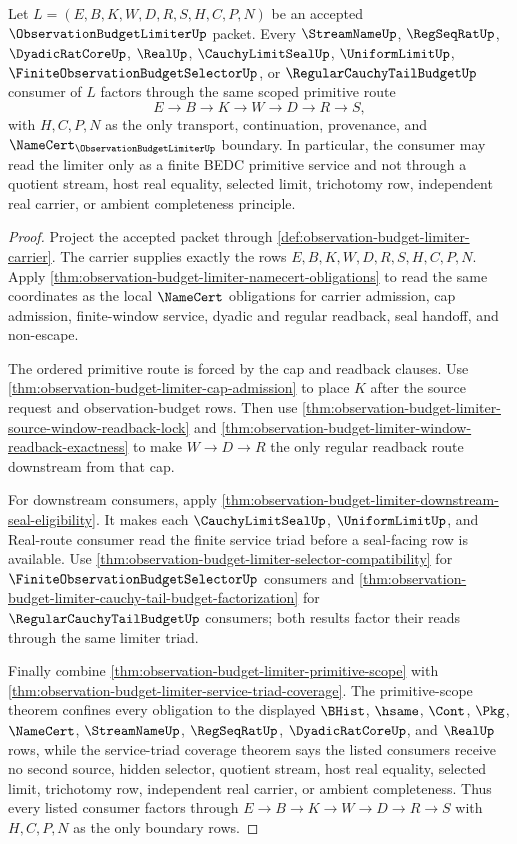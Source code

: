 \begin{theorem}
\label{thm:observation-budget-limiter-scoped-route-factorization}
Let $L=(E,B,K,W,D,R,S,H,C,P,N)$ be an accepted $\ObservationBudgetLimiterUp$ packet. Every $\StreamNameUp$, $\RegSeqRatUp$, $\DyadicRatCoreUp$, $\RealUp$, $\CauchyLimitSealUp$, $\UniformLimitUp$, $\FiniteObservationBudgetSelectorUp$, or $\RegularCauchyTailBudgetUp$ consumer of $L$ factors through the same scoped primitive route
$$
E \to B \to K \to W \to D \to R \to S,
$$
with $H,C,P,N$ as the only transport, continuation, provenance, and $\NameCert_{\ObservationBudgetLimiterUp}$ boundary. In particular, the consumer may read the limiter only as a finite BEDC primitive service and not through a quotient stream, host real equality, selected limit, trichotomy row, independent real carrier, or ambient completeness principle.
\end{theorem}
\begin{proof}
Project the accepted packet through \autoref{def:observation-budget-limiter-carrier}. The carrier supplies exactly the rows $E,B,K,W,D,R,S,H,C,P,N$. Apply \autoref{thm:observation-budget-limiter-namecert-obligations} to read the same coordinates as the local $\NameCert$ obligations for carrier admission, cap admission, finite-window service, dyadic and regular readback, seal handoff, and non-escape.

The ordered primitive route is forced by the cap and readback clauses. Use \autoref{thm:observation-budget-limiter-cap-admission} to place $K$ after the source request and observation-budget rows. Then use \autoref{thm:observation-budget-limiter-source-window-readback-lock} and \autoref{thm:observation-budget-limiter-window-readback-exactness} to make $W \to D \to R$ the only regular readback route downstream from that cap.

For downstream consumers, apply \autoref{thm:observation-budget-limiter-downstream-seal-eligibility}. It makes each $\CauchyLimitSealUp$, $\UniformLimitUp$, and Real-route consumer read the finite service triad before a seal-facing row is available. Use \autoref{thm:observation-budget-limiter-selector-compatibility} for $\FiniteObservationBudgetSelectorUp$ consumers and \autoref{thm:observation-budget-limiter-cauchy-tail-budget-factorization} for $\RegularCauchyTailBudgetUp$ consumers; both results factor their reads through the same limiter triad.

Finally combine \autoref{thm:observation-budget-limiter-primitive-scope} with \autoref{thm:observation-budget-limiter-service-triad-coverage}. The primitive-scope theorem confines every obligation to the displayed $\BHist$, $\hsame$, $\Cont$, $\Pkg$, $\NameCert$, $\StreamNameUp$, $\RegSeqRatUp$, $\DyadicRatCoreUp$, and $\RealUp$ rows, while the service-triad coverage theorem says the listed consumers receive no second source, hidden selector, quotient stream, host real equality, selected limit, trichotomy row, independent real carrier, or ambient completeness. Thus every listed consumer factors through $E \to B \to K \to W \to D \to R \to S$ with $H,C,P,N$ as the only boundary rows.
\end{proof}

